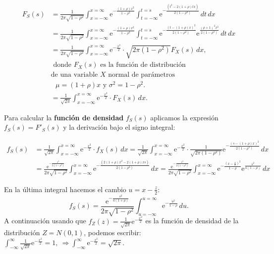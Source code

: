 \documentclass[
  letterpaper,
  DIV=11,
  numbers=noendperiod]{scrreprt}
\begin{document}
\[
\begin{array}{rl}
F_S(s) 
& =  \displaystyle \frac{1}{2\pi\sqrt{1-\rho^2}} \int_{x=-\infty}^{x=\infty} \mathrm{e}^{-\frac{(1+\rho)x^2}{1-\rho^2}}\int_{t=-\infty}^{t=s} \mathrm{e}^{-\frac{(t^2-2(1+\rho) t x)}{2(1-\rho^2)}}\, dt\, dx \\
& = \frac{1}{2\pi\sqrt{1-\rho^2}} \int_{x=-\infty}^{x=\infty} \mathrm{e}^{-\frac{(1+\rho)x^2}{1-\rho^2}}\int_{t=-\infty}^{t=s} \mathrm{e}^{-\frac{(t-(1+\rho)x)^2}{2(1-\rho^2)}} \mathrm{e}^{\frac{(\rho+1)^2 x^2}{2(1-\rho^2)}}\, dt\, dx  \\
& = \frac{1}{2\pi\sqrt{1-\rho^2}} \int_{x=-\infty}^{x=\infty} \mathrm{e}^{-\frac{x^2}{2}}\cdot \sqrt{2\pi (1-\rho^2)} F_X(s)\, dx, \\ 
& \mbox{ donde $F_X(s)$ es la función de distribución}\\
& \mbox{de una variable $X$ normal de parámetros} \\ 
& \mbox{ $\mu =(1+\rho)x$ y $\sigma^2=1-\rho^2$.} \\ 
& = \frac{1}{\sqrt{2\pi}}\int_{x=-\infty}^{x=\infty} \mathrm{e}^{-\frac{x^2}{2}}\cdot F_X(s)\, dx.
\end{array}
\]

Para calcular la \textbf{función de densidad} \(f_S(s)\) aplicamos la
expresión \(f_S(s)=F'_S(s)\) y la derivación bajo el signo integral:

\[
\begin{array}{rl}
f_S(s) & = \frac{1}{\sqrt{2\pi}}\int_{x=-\infty}^{x=\infty} \mathrm{e}^{-\frac{x^2}{2}}\cdot f_X(s)\, dx = \frac{1}{\sqrt{2\pi}}\int_{x=-\infty}^{x=\infty} \mathrm{e}^{-\frac{x^2}{2}}\cdot \frac{1}{\sqrt{2\pi (1-\rho^2)}}\mathrm{e}^{-\frac{(s-(1+\rho)x)^2}{2(1-\rho^2)}}\, dx \\ & = \frac{\mathrm{e}^{-\frac{s^2}{2(1-\rho^2)}}}{2\pi\sqrt{1-\rho^2}} \int_{x=-\infty}^{x=\infty} \mathrm{e}^{-\frac{(2(1+\rho) x^2-2(1+\rho)xs)}{2(1-\rho^2)}}\, dx= \frac{\mathrm{e}^{-\frac{s^2}{2(1-\rho^2)}}}{2\pi\sqrt{1-\rho^2}} \int_{x=-\infty}^{x=\infty} \mathrm{e}^{-\frac{\left(x-\frac{s}{2}\right)^2}{1-\rho}}\mathrm{e}^{\frac{s^2}{4(1-\rho)}}\, dx
\end{array}
\]

En la última integral hacemos el cambio \(u=x-\frac{z}{2}\): \[
f_S(s)  =\frac{\mathrm{e}^{-\frac{s^2}{4(1+\rho)}}}{2\pi\sqrt{1-\rho^2}} \int_{u=-\infty}^{u=\infty} \mathrm{e}^{-\frac{u^2}{1-\rho}}\, du.
\] A continuación usando que
\(f_Z(z)=\frac{1}{\sqrt{2\pi}}\mathrm{e}^{-\frac{x^2}{2}}\) es la
función de densidad de la distribución \(Z=N(0,1)\), podemos escribir:
\(\int_{-\infty}^\infty \frac{1}{\sqrt{2\pi}}\mathrm{e}^{-\frac{x^2}{2}}=1,\ \Rightarrow \int_{-\infty}^\infty \mathrm{e}^{-\frac{x^2}{2}}=\sqrt{2\pi}.\)
\end{document}
